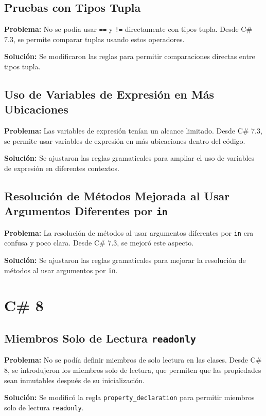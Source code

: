 \subsection*{Pruebas con Tipos Tupla}
\textbf{Problema:} No se podía usar \texttt{==} y \texttt{!=} directamente con tipos tupla. Desde C\# 7.3, se permite comparar tuplas usando estos operadores.

\textbf{Solución:} Se modificaron las reglas para permitir comparaciones directas entre tipos tupla.

\subsection*{Uso de Variables de Expresión en Más Ubicaciones}
\textbf{Problema:} Las variables de expresión tenían un alcance limitado. Desde C\# 7.3, se permite usar variables de expresión en más ubicaciones dentro del código.

\textbf{Solución:} Se ajustaron las reglas gramaticales para ampliar el uso de variables de expresión en diferentes contextos.

\subsection*{Resolución de Métodos Mejorada al Usar Argumentos Diferentes por \texttt{in}}
\textbf{Problema:} La resolución de métodos al usar argumentos diferentes por \texttt{in} era confusa y poco clara. Desde C\# 7.3, se mejoró este aspecto.

\textbf{Solución:} Se ajustaron las reglas gramaticales para mejorar la resolución de métodos al usar argumentos por \texttt{in}.

\section{C\# 8}

\subsection*{Miembros Solo de Lectura \texttt{readonly}}
\textbf{Problema:} No se podía definir miembros de solo lectura en las clases. Desde C\# 8, se introdujeron los miembros solo de lectura, que permiten que las propiedades sean inmutables después de su inicialización.

\textbf{Solución:} Se modificó la regla \texttt{property\_declaration} para permitir miembros solo de lectura \texttt{readonly}.

